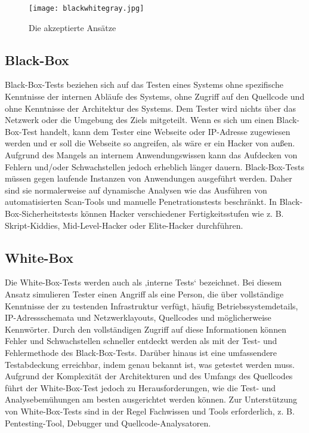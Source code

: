 \begin{figure}[h]
	\centering
	\texttt{[image: blackwhitegray.jpg]}
	\caption{Die akzeptierte Ansätze\cite{bwgtesting16}}
\end{figure}

\subsection{Black-Box}

Black-Box-Tests beziehen sich auf das Testen eines Systems ohne spezifische Kenntnisse der internen Abläufe des Systems, ohne Zugriff auf den Quellcode und ohne Kenntnisse der Architektur des Systems\cite{bwgwebtesting07}. Dem Tester wird nichts über das Netzwerk oder die Umgebung des Ziels mitgeteilt\cite{tiller2004ethical}. Wenn es sich um einen Black-Box-Test handelt, kann dem Tester eine Webseite oder IP-Adresse zugewiesen werden und er soll die Webseite so angreifen, als wäre er ein Hacker von außen\cite{whitaker2005penetration}. Aufgrund des Mangels an internem Anwendungswissen kann das Aufdecken von Fehlern und/oder Schwachstellen jedoch erheblich länger dauern. Black-Box-Tests müssen gegen laufende Instanzen von Anwendungen ausgeführt werden. Daher sind sie normalerweise auf dynamische Analysen wie das Ausführen von automatisierten Scan-Tools und manuelle Penetrationstests beschränkt\cite{bwgwebtesting07}. In Black-Box-Sicherheitstests können Hacker verschiedener Fertigkeitsstufen wie z. B. Skript-Kiddies, Mid-Level-Hacker oder Elite-Hacker durchführen\cite{bwgprole18}.

\subsection{White-Box}

Die White-Box-Tests werden auch als ‚interne Tests‘ bezeichnet. Bei diesem Ansatz simulieren Tester einen Angriff als eine Person, die über vollständige Kenntnisse der zu testenden Infrastruktur verfügt, häufig Betriebssystemdetails, IP-Adressschemata und Netzwerklayouts, Quellcodes und möglicherweise Kennwörter\cite{ali2011pt}. Durch den vollständigen Zugriff auf diese Informationen können Fehler und Schwachstellen schneller entdeckt werden als mit der Test- und Fehlermethode des Black-Box-Tests. Darüber hinaus ist eine umfassendere Testabdeckung erreichbar, indem genau bekannt ist, was getestet werden muss. Aufgrund der Komplexität der Architekturen und des Umfangs des Quellcodes führt der White-Box-Test jedoch zu Herausforderungen, wie die Test- und Analysebemühungen am besten ausgerichtet werden können. Zur Unterstützung von White-Box-Tests sind in der Regel Fachwissen und Tools erforderlich, z. B. Pentesting-Tool, Debugger und Quellcode-Analysatoren\cite{bwgwebtesting07}.

